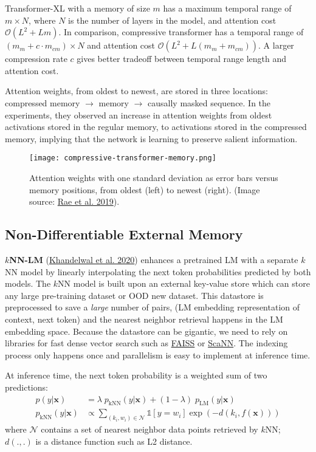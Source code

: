 \documentclass[12pt]{article}
\begin{document}
Transformer-XL with a memory of size $m$ has a maximum temporal range of $m \times N$, where $N$ is the number of layers in the model, and attention cost $\mathcal{O}(L^2 + Lm)$. In comparison, compressive transformer has a temporal range of $(m_m + c \cdot m_{cm}) \times N$ and attention cost $\mathcal{O}(L^2 + L(m_m + m_{cm}))$. A larger compression rate $c$ gives better tradeoff between temporal range length and attention cost.

Attention weights, from oldest to newest, are stored in three locations: compressed memory $\rightarrow$ memory $\rightarrow$ causally masked sequence. In the experiments, they observed an increase in attention weights from oldest activations stored in the regular memory, to activations stored in the compressed memory, implying that the network is learning to preserve salient information.

\begin{figure}[h!]
    \centering
    \texttt{[image: compressive-transformer-memory.png]}
    \caption{Attention weights with one standard deviation as error bars versus memory positions, from oldest (left) to newest (right). (Image source: \href{https://arxiv.org/abs/1911.05507}{Rae et al. 2019}).}
\end{figure}

\subsection{Non-Differentiable External Memory}
\textbf{$k$NN-LM} (\href{https://arxiv.org/abs/1911.00172}{Khandelwal et al. 2020}) enhances a pretrained LM with a separate $k$NN model by linearly interpolating the next token probabilities predicted by both models. The $k$NN model is built upon an external key-value store which can store any large pre-training dataset or OOD new dataset. This datastore is preprocessed to save a \emph{large} number of pairs, (LM embedding representation of context, next token) and the nearest neighbor retrieval happens in the LM embedding space. Because the datastore can be gigantic, we need to rely on libraries for fast dense vector search such as \href{https://github.com/facebookresearch/faiss}{FAISS} or \href{https://github.com/google-research/google-research/tree/master/scann}{ScaNN}. The indexing process only happens once and parallelism is easy to implement at inference time.

At inference time, the next token probability is a weighted sum of two predictions:
\[
\begin{aligned}
p(y \vert \mathbf{x}) &= \lambda \; p_\text{kNN}(y \vert \mathbf{x}) + (1- \lambda) \; p_\text{LM}(y \vert \mathbf{x}) \\
p_\text{kNN}(y \vert \mathbf{x}) &\propto \sum_{(k_i, w_i) \in \mathcal{N}} \mathbb{1}[y = w_i] \exp(-d(k_i, f(\mathbf{x})))
\end{aligned}
\]
where $\mathcal{N}$ contains a set of nearest neighbor data points retrieved by $k$NN; $d(., .)$ is a distance function such as L2 distance.
\end{document}
